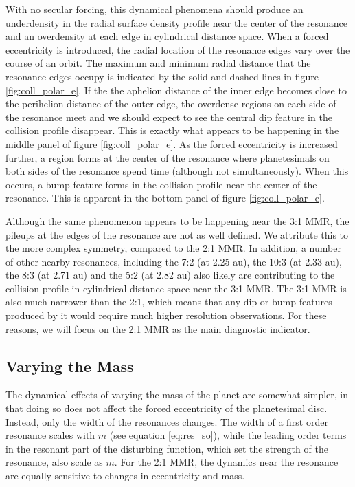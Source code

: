 \documentclass[fleqn,usenatbib]{mnras}
\begin{document}
With no secular forcing, this dynamical phenomena should produce an underdensity in the radial surface density profile near the center of the 
resonance and an overdensity at each edge in cylindrical distance space. When a forced eccentricity is introduced, the radial location of the 
resonance edges vary over the course of an orbit. The maximum and minimum radial distance that the resonance edges occupy is indicated by the 
solid and dashed lines in figure \ref{fig:coll_polar_e}. If the the aphelion distance of the inner edge becomes close to the perihelion distance of 
the outer edge, the overdense regions on each side of the resonance meet and we should expect to see the central dip feature in the collision profile 
disappear. This is exactly what appears to be happening in the middle panel of figure \ref{fig:coll_polar_e}. As the forced eccentricity is increased 
further, a region forms at the center of the resonance where planetesimals on both sides of the resonance spend time (although not simultaneously). 
When this occurs, a bump feature forms in the collision profile near the center of the resonance. This is apparent in the bottom panel of figure 
\ref{fig:coll_polar_e}.

Although the same phenomenon appears to be happening near the 3:1 MMR, the pileups at the edges of the resonance are not as well defined. We 
attribute this to the more complex symmetry, compared to the 2:1 MMR. In addition, a number of other nearby resonances, including the 7:2 (at 
2.25 au), the 10:3 (at 2.33 au), the 8:3 (at 2.71 au) and the 5:2 (at 2.82 au) also likely are contributing to the collision profile in cylindrical distance 
space near the 3:1 MMR. The 3:1 MMR is also much narrower than the 2:1, which means that any dip or bump features produced by it would 
require much higher resolution observations. For these reasons, we will focus on the 2:1 MMR as the main diagnostic indicator.

\subsection{Varying the Mass}

The dynamical effects of varying the mass of the planet are somewhat simpler, in that doing so does not affect the forced eccentricity of the 
planetesimal disc. Instead, only the width of the resonances changes. The width of a first order resonance scales with $m$ (see equation 
\ref{eq:res_so}), while the leading order terms in the resonant part of the disturbing function, which set the strength of the resonance, also scale as 
$m$. For the 2:1 MMR, the dynamics near the resonance are equally sensitive to changes in eccentricity and mass.
\end{document}
